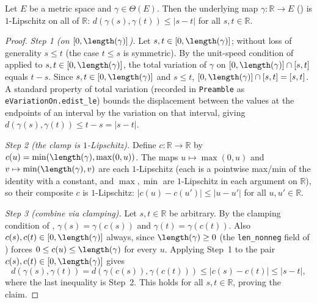 \begin{lemma}
  Let $E$ be a metric space and $\gamma \in \Theta(E)$. Then the underlying map
  $\gamma \colon \mathbb{R} \to E$ () is $1$-Lipschitz on all of $\mathbb{R}$:
  $d(\gamma(s), \gamma(t)) \le |s - t|$ for all $s, t \in \mathbb{R}$.
\end{lemma}
\begin{proof}
  \emph{Step 1 (on $[0,\length(\gamma)]$).} Let $s, t \in [0,\length(\gamma)]$; without loss of
  generality $s \le t$ (the case $t \le s$ is symmetric). By the unit-speed condition of
   applied to $s,t \in [0,\length(\gamma)]$, the total variation of $\gamma$ on
  $[0,\length(\gamma)] \cap [s,t]$ equals $t - s$. Since $s,t \in [0,\length(\gamma)]$ and $s \le t$,
  $[0,\length(\gamma)] \cap [s,t] = [s,t]$. A standard property of total variation (recorded in
  \texttt{Preamble} as \texttt{eVariationOn.edist\_le}) bounds the displacement between the values
  at the endpoints of an interval by the variation on that interval, giving
  $d(\gamma(s),\gamma(t)) \le t - s = |s-t|$.

  \emph{Step 2 (the clamp is $1$-Lipschitz).} Define $c \colon \mathbb{R} \to \mathbb{R}$ by
  $c(u) = \min(\length(\gamma), \max(0,u))$. The maps $u \mapsto \max(0,u)$ and
  $v \mapsto \min(\length(\gamma), v)$ are each $1$-Lipschitz (each is a pointwise max/min of the
  identity with a constant, and $\max,\min$ are $1$-Lipschitz in each argument on $\mathbb{R}$), so
  their composite $c$ is $1$-Lipschitz: $|c(u) - c(u')| \le |u - u'|$ for all $u,u' \in \mathbb{R}$.

  \emph{Step 3 (combine via clamping).} Let $s,t \in \mathbb{R}$ be arbitrary. By the clamping
  condition of , $\gamma(s) = \gamma(c(s))$ and $\gamma(t) = \gamma(c(t))$. Also
  $c(s), c(t) \in [0,\length(\gamma)]$ always, since $\length(\gamma) \ge 0$ (the \texttt{len\_nonneg}
  field of ) forces $0 \le c(u) \le \length(\gamma)$ for every $u$. Applying Step~1
  to the pair $c(s), c(t) \in [0,\length(\gamma)]$ gives
  \[
    d(\gamma(s),\gamma(t)) = d(\gamma(c(s)), \gamma(c(t))) \le |c(s) - c(t)| \le |s - t|,
  \]
  where the last inequality is Step~2. This holds for all $s,t \in \mathbb{R}$, proving the claim.
\end{proof}
